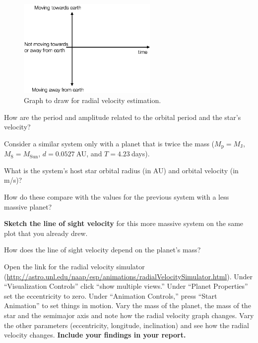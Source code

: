 \begin{figure}
	\centering
	\includegraphics[width=0.6\textwidth]{radial-velocity/radial-graph}
	\caption{Graph to draw for radial velocity estimation.}\label{rv:fig:graph}
\end{figure}

\begin{steps}
	\item How are the period and amplitude related to the orbital period and the star’s velocity?
\end{steps}

Consider a similar system only with a planet that is twice the mass ($M_\textrm{p} = M_\textrm{J}$, $M_\textrm{S} = M_\textrm{Sun}$, $d = 0.0527\:$AU, and $T = 4.23\:$days).

\begin{steps}
	\item What is the system's host star orbital radius (in AU) and orbital velocity (in m/s)?
	
	\item How do these compare with the values for the previous system with a less massive planet?
\end{steps}

\textbf{Sketch the line of sight velocity} for this more massive system on the same plot that you already drew.

\begin{steps}
	\item How does the line of sight velocity depend on the planet’s mass?
\end{steps}

Open the link for the radial velocity simulator (\url{http://astro.unl.edu/naap/esp/animations/radialVelocitySimulator.html}). Under ``Visualization Controls'' click ``show multiple views.'' Under ``Planet Properties'' set the eccentricity to zero. Under ``Animation Controls,'' press ``Start Animation'' to set things in motion. Vary the mass of the planet, the mass of the star and the semimajor axis and note how the radial velocity graph changes. Vary the other parameters (eccentricity, longitude, inclination) and see how the radial velocity changes. \textbf{Include your findings in your report.}

